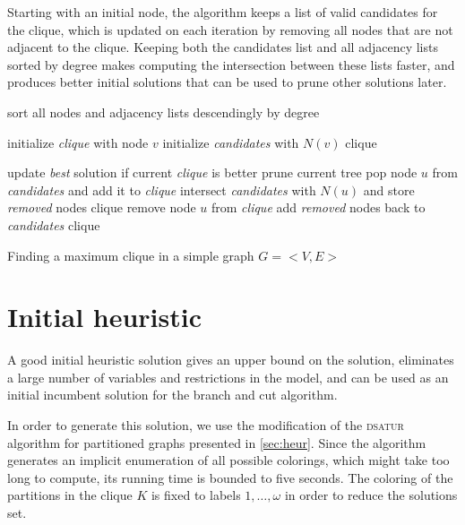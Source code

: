Starting with an initial node, the algorithm keeps a list of valid candidates for the clique, which is updated on each iteration by removing all nodes that are not adjacent to the clique. Keeping both the candidates list and all adjacency lists sorted by degree makes computing the intersection between these lists faster, and produces better initial solutions that can be used to prune other solutions later.

\begin{algorithm}

\begin{algorithmic}

\STATE sort all nodes and adjacency lists descendingly by degree

	\STATE initialize \textit{clique} with node $v$
	\STATE initialize \textit{candidates} with $N(v)$
	\CALL clique 
\ENDFOR

		\STATE update \textit{best} solution if current \textit{clique} is better
		\STATE prune current tree
	\ELSE
		\STATE pop node $u$ from \textit{candidates} and add it to \textit{clique}
		\STATE intersect \textit{candidates} with $N(u)$ and store \textit{removed} nodes
		\CALL clique
		\STATE remove node $u$ from \textit{clique}
		\STATE add \textit{removed} nodes back to \textit{candidates} 
		\CALL clique
	\ENDIF
\ENDPROC

\end{algorithmic}

\caption{Finding a maximum clique in a simple graph $G=<V,E>$}
\label{alg:gpclique}

\end{algorithm} 

\section{Initial heuristic}

A good initial heuristic solution gives an upper bound on the solution, eliminates a large number of variables and restrictions in the model, and can be used as an initial incumbent solution for the branch and cut algorithm. 

In order to generate this solution, we use the modification of the \textsc{dsatur} algorithm for partitioned graphs presented in \ref{sec:heur}. Since the algorithm generates an implicit enumeration of all possible colorings, which might take too long to compute, its running time is bounded to five seconds. The coloring of the partitions in the clique $K$ is fixed to labels $1, \ldots, \omega$ in order to reduce the solutions set.

